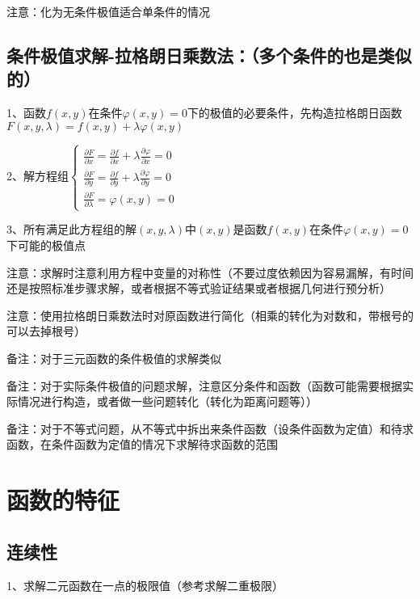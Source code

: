 注意：化为无条件极值适合单条件的情况



\subsection{条件极值求解-拉格朗日乘数法：（多个条件的也是类似的）}

1、函数$f(x, y)$在条件$\varphi(x, y)=0$下的极值的必要条件，先构造拉格朗日函数$F(x, y, \lambda)=f(x, y)+\lambda \varphi(x, y)$

2、解方程组$\left\{\begin{array}{l} \frac{\partial F}{\partial x}=\frac{\partial f}{\partial x}+\lambda \frac{\partial \varphi}{\partial x}=0 \\ \frac{\partial F}{\partial y}=\frac{\partial f}{\partial y}+\lambda \frac{\partial \varphi}{\partial y}=0 \\ \frac{\partial F}{\partial \lambda}=\varphi(x, y)=0 \end{array}\right.$

3、所有满足此方程组的解$(x, y, \lambda)$中$(x, y)$是函数$f(x, y)$在条件$\varphi(x, y)=0$下可能的极值点

注意：求解时注意利用方程中变量的对称性（不要过度依赖因为容易漏解，有时间还是按照标准步骤求解，或者根据不等式验证结果或者根据几何进行预分析）

注意：使用拉格朗日乘数法时对原函数进行简化（相乘的转化为对数和，带根号的可以去掉根号）

备注：对于三元函数的条件极值的求解类似

备注：对于实际条件极值的问题求解，注意区分条件和函数（函数可能需要根据实际情况进行构造，或者做一些问题转化（转化为距离问题等））

备注：对于不等式问题，从不等式中拆出来条件函数（设条件函数为定值）和待求函数，在条件函数为定值的情况下求解待求函数的范围



\section{函数的特征}



\subsection{连续性}

1、求解二元函数在一点的极限值（参考求解二重极限）




